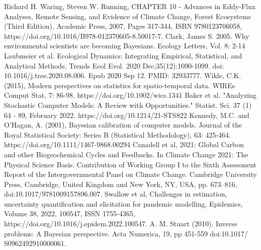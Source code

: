 \documentclass[12pt]{article}
\begin{document}
\begin{thebibliography}{20}
 Richard H. Waring, Steven W. Running, CHAPTER 10 - Advances in Eddy-Flux Analyses, Remote Sensing, and Evidence of Climate Change, Forest Ecosystems (Third Edition), Academic Press, 2007, Pages 317-344, ISBN 9780123706058, https://doi.org/10.1016/B978-012370605-8.50017-7.
 Clark, James S. 2005. Why environmental scientists are becoming Bayesians. Ecology Letters, Vol. 8: 2-14
 Laubmeier et al. Ecological Dynamics: Integrating Empirical, Statistical, and Analytical Methods. Trends Ecol Evol. 2020 Dec;35(12):1090-1099. doi: 10.1016/j.tree.2020.08.006. Epub 2020 Sep 12. PMID: 32933777.
 Wikle, C.K. (2015), Modern perspectives on statistics for spatio-temporal data. WIREs Comput Stat, 7: 86-98. https://doi.org/10.1002/wics.1341
 Baker et al. "Analyzing Stochastic Computer Models: A Review with Opportunities." Statist. Sci. 37 (1) 64 - 89, February 2022. https://doi.org/10.1214/21-STS822
 Kennedy, M.C. and O'Hagan, A. (2001), Bayesian calibration of computer models. Journal of the Royal Statistical Society: Series B (Statistical Methodology), 63: 425-464. https://doi.org/10.1111/1467-9868.00294
 Canadell et al, 2021: Global Carbon and
other Biogeochemical Cycles and Feedbacks. In Climate Change 2021: The Physical Science Basis. Contribution of
Working Group I to the Sixth Assessment Report of the Intergovernmental Panel on Climate Change. Cambridge University Press,
Cambridge, United Kingdom and New York, NY, USA, pp. 673–816, doi:10.1017/9781009157896.007.
 Swallow et al, Challenges in estimation, uncertainty quantification and elicitation for pandemic modelling, Epidemics, Volume 38, 2022, 100547, ISSN 1755-4365, https://doi.org/10.1016/j.epidem.2022.100547.
 A. M. Stuart (2010). Inverse problems: A Bayesian perspective. Acta Numerica, 19, pp 451-559 doi:10.1017/
S0962492910000061.
\end{thebibliography}
\end{document}
